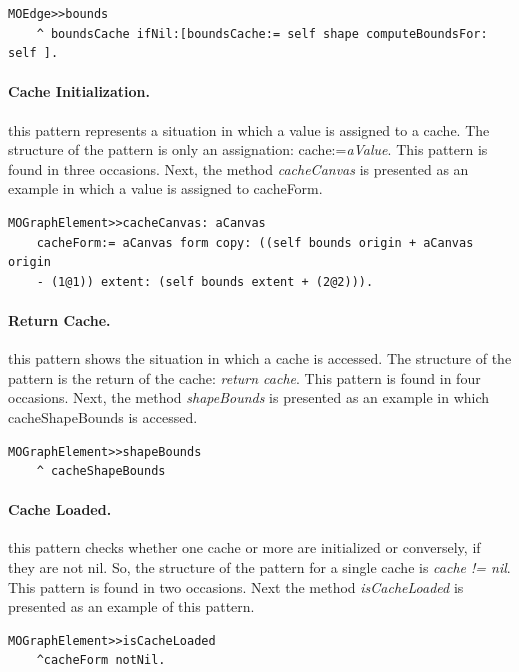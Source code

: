 \documentclass[preprint,10pt]{sigplanconf}
\begin{document}
\begin{lstlisting} 
MOEdge>>bounds  
	^ boundsCache ifNil:[boundsCache:= self shape computeBoundsFor: self ]. 
\end{lstlisting}

\paragraph{Cache Initialization.} this pattern represents a situation in
which a value is assigned to a cache. The structure of the pattern
is only an assignation: cache:=\emph{aValue}. This pattern is found
in three occasions. Next, the method \emph{cacheCanvas} is presented
as an example in which a value is assigned to cacheForm.

\begin{lstlisting} 
MOGraphElement>>cacheCanvas: aCanvas 
	cacheForm:= aCanvas form copy: ((self bounds origin + aCanvas origin 
	- (1@1)) extent: (self bounds extent + (2@2))). 
\end{lstlisting}

\paragraph{Return Cache.} this pattern shows the situation in which a cache
is accessed. The structure of the pattern is the return of the cache:
\emph{return cache}. This pattern is found in four occasions. Next,
the method \emph{shapeBounds} is presented as an example in which
cacheShapeBounds is accessed.

\begin{lstlisting} 
MOGraphElement>>shapeBounds  
	^ cacheShapeBounds
\end{lstlisting}

\paragraph{Cache Loaded.} this pattern checks whether one cache or more
are initialized or conversely, if they are not nil. So, the structure of the
pattern for a single cache is \emph{cache != nil}. This pattern is
found in two occasions. Next the method \emph{isCacheLoaded} is presented
as an example of this pattern.

\begin{lstlisting} 
MOGraphElement>>isCacheLoaded 
	^cacheForm notNil. 
\end{lstlisting}
\end{document}
